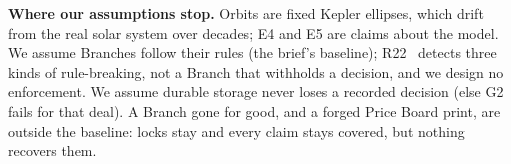 \textbf{Where our assumptions stop.} Orbits are fixed Kepler ellipses, which drift from the real solar system over decades; E4 and E5 are claims about the model. We assume Branches follow their rules (the brief's baseline); R22 \extension \ detects three kinds of rule-breaking, not a Branch that withholds a decision, and we design no enforcement. We assume durable storage never loses a recorded decision (else G2 fails for that deal). A Branch gone for good, and a forged Price Board print, are outside the baseline: locks stay and every claim stays covered, but nothing recovers them.

